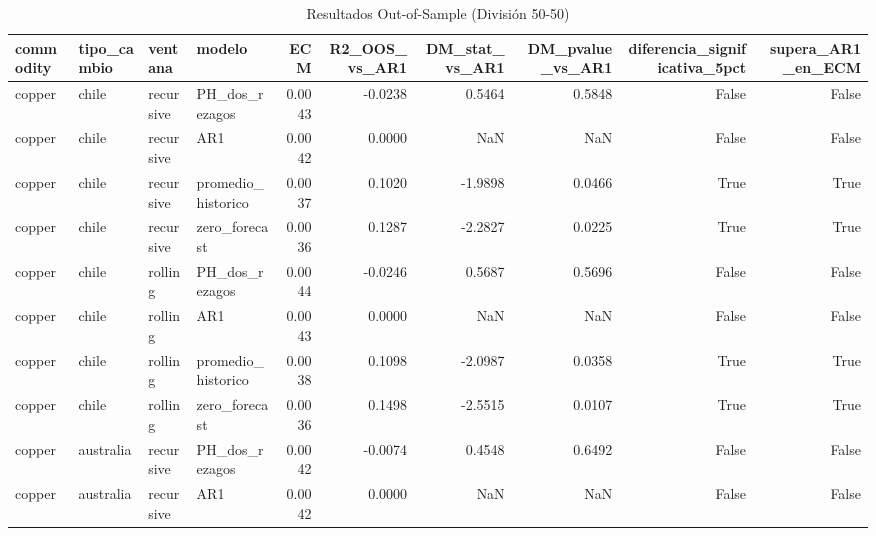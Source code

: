 \begin{table}
\caption{Resultados Out-of-Sample (División 50-50)}
\label{tab:oos_50}
\begin{tabular}{llllrrrrrr}
\toprule
commodity & tipo_cambio & ventana & modelo & ECM & R2_OOS_vs_AR1 & DM_stat_vs_AR1 & DM_pvalue_vs_AR1 & diferencia_significativa_5pct & supera_AR1_en_ECM \\
\midrule
copper & chile & recursive & PH_dos_rezagos & 0.0043 & -0.0238 & 0.5464 & 0.5848 & False & False \\
copper & chile & recursive & AR1 & 0.0042 & 0.0000 & NaN & NaN & False & False \\
copper & chile & recursive & promedio_historico & 0.0037 & 0.1020 & -1.9898 & 0.0466 & True & True \\
copper & chile & recursive & zero_forecast & 0.0036 & 0.1287 & -2.2827 & 0.0225 & True & True \\
copper & chile & rolling & PH_dos_rezagos & 0.0044 & -0.0246 & 0.5687 & 0.5696 & False & False \\
copper & chile & rolling & AR1 & 0.0043 & 0.0000 & NaN & NaN & False & False \\
copper & chile & rolling & promedio_historico & 0.0038 & 0.1098 & -2.0987 & 0.0358 & True & True \\
copper & chile & rolling & zero_forecast & 0.0036 & 0.1498 & -2.5515 & 0.0107 & True & True \\
copper & australia & recursive & PH_dos_rezagos & 0.0042 & -0.0074 & 0.4548 & 0.6492 & False & False \\
copper & australia & recursive & AR1 & 0.0042 & 0.0000 & NaN & NaN & False & False \\
\bottomrule
\end{tabular}
\end{table}
